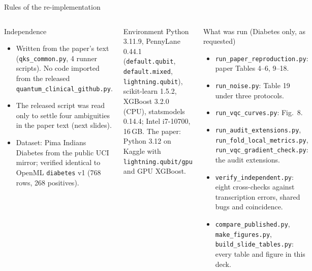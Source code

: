 \documentclass[aspectratio=169,10pt,t,xcolor={table}]{beamer}
\newcommand{\code}[1]{\texttt{\small #1}}
\begin{document}
\begin{frame}{Rules of the re-implementation}
\begin{columns}[T]
\begin{block}{Independence}
\begin{itemize}\footnotesize
  \item Written from the paper's text (\code{qks\_common.py}, 4 runner scripts). No code imported from the released \code{quantum\_clinical\_github.py}.
  \item The released script was read only to settle four ambiguities in the paper text (next slides).
  \item Dataset: Pima Indians Diabetes from the public UCI mirror; verified identical to OpenML \code{diabetes} v1 (768 rows, 268 positives).
\end{itemize}
\end{block}
\begin{block}{Environment}
\footnotesize Python 3.11.9, PennyLane 0.44.1 (\code{default.qubit}, \code{default.mixed}, \code{lightning.qubit}), scikit-learn 1.5.2, XGBoost 3.2.0 (CPU), statsmodels 0.14.4; Intel i7-10700, 16\,GB. The paper: Python 3.12 on Kaggle with \code{lightning.qubit/gpu} and GPU XGBoost.
\end{block}
\begin{block}{What was run (Diabetes only, as requested)}
\begin{itemize}\footnotesize
  \item \code{run\_paper\_reproduction.py}: paper Tables 4--6, 9--18.
  \item \code{run\_noise.py}: Table 19 under three protocols.
  \item \code{run\_vqc\_curves.py}: Fig.~8.
  \item \code{run\_audit\_extensions.py}, \code{run\_fold\_local\_metrics.py}, \code{run\_vqc\_gradient\_check.py}: the audit extensions.
  \item \code{verify\_independent.py}: eight cross-checks against transcription errors, shared bugs and coincidence.
  \item \code{compare\_published.py}, \code{make\_figures.py}, \code{build\_slide\_tables.py}: every table and figure in this deck.
\end{itemize}
\end{block}
\end{columns}
\end{frame}
\end{document}
